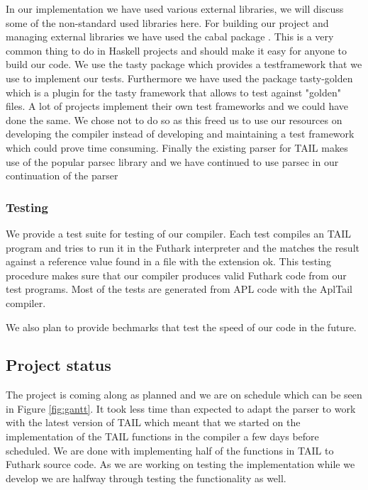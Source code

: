 \documentclass[11pt]{article}
\begin{document}
In our implementation we have used various external libraries, we will discuss some of the non-standard used libraries here.
For building our project and managing external libraries we have used the cabal package \cite{cabal}. This is a very common thing to
do in Haskell projects and should make it easy for anyone to build our code.
We use the tasty package \cite{tasty} which provides a testframework that we use to implement our tests. Furthermore we have used the
package tasty-golden \cite{tasty-golden} which is a plugin for the tasty framework that allows to test against "golden" files.
A lot of projects implement their own test frameworks and we could have done the same.
We chose not to do so as this freed us to use our resources on developing the compiler instead of developing and maintaining a
test framework which could prove time consuming.
Finally the existing parser for TAIL makes use of the popular parsec library \cite{parsec} and we have continued to use
parsec in our continuation of the parser

\subsubsection{Testing}

We provide a test suite for testing of our compiler.
Each test compiles an TAIL program and tries to run it in the Futhark interpreter and the matches the result against a reference
value found in a file with the extension ok.
This testing procedure makes sure that our compiler produces valid Futhark code from our test programs.
Most of the tests are generated from APL code with the AplTail compiler.

We also plan to provide bechmarks that test the speed of our code in the future.

\subsection{Project status}
The project is coming along as planned and we are on schedule which can be seen in Figure \ref{fig:gantt}.
It took less time than expected to adapt the parser to work with the latest version of TAIL
which meant that we started on the implementation of the TAIL functions in the compiler a few days before scheduled. 
We are done with implementing half of the functions in TAIL to Futhark source code.
As we are working on testing the implementation while we develop we are halfway through testing the functionality as well. 
\end{document}
